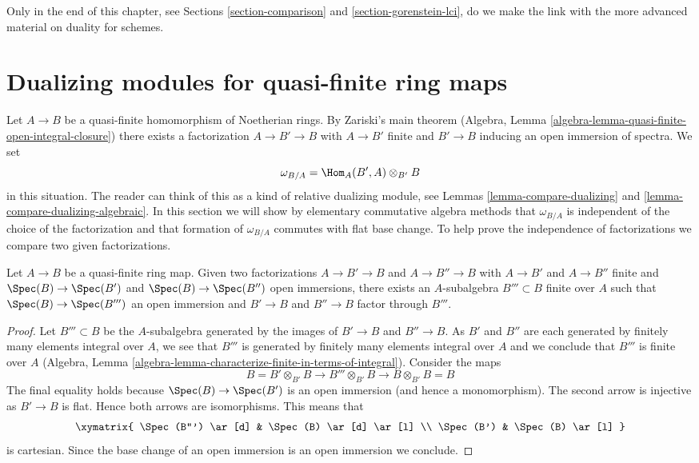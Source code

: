\medskip\noindent
Only in the end of this chapter, see
Sections \ref{section-comparison} and \ref{section-gorenstein-lci},
do we make the link with the more advanced material
on duality for schemes.








\section{Dualizing modules for quasi-finite ring maps}
\label{section-quasi-finite-dualizing}

\noindent
Let $A \to B$ be a quasi-finite homomorphism of Noetherian rings. By
Zariski's main theorem
(Algebra, Lemma \ref{algebra-lemma-quasi-finite-open-integral-closure})
there exists a factorization $A \to B' \to B$ with
$A \to B'$ finite and $B' \to B$ inducing an open immersion of spectra.
We set
\begin{equation}
\label{equation-dualizing}
\omega_{B/A} = \Hom_A(B', A) \otimes_{B'} B
\end{equation}
in this situation. The reader can think of this as a kind of relative
dualizing module, see Lemmas \ref{lemma-compare-dualizing} and
\ref{lemma-compare-dualizing-algebraic}.
In this section we will show by elementary commutative algebra methods
that $\omega_{B/A}$ is independent of the choice of the factorization
and that formation of $\omega_{B/A}$ commutes with flat base change.
To help prove the independence of factorizations we compare two
given factorizations.

\begin{lemma}
\label{lemma-dominate-factorizations}
Let $A \to B$ be a quasi-finite ring map. Given two factorizations
$A \to B' \to B$ and $A \to B'' \to B$ with
$A \to B'$ and $A \to B''$ finite and $\Spec(B) \to \Spec(B')$
and $\Spec(B) \to \Spec(B'')$ open immersions, there exists
an $A$-subalgebra $B''' \subset B$ finite over $A$ such that
$\Spec(B) \to \Spec(B''')$ an open immersion and $B' \to B$ and
$B'' \to B$ factor through $B'''$.
\end{lemma}

\begin{proof}
Let $B''' \subset B$ be the $A$-subalgebra generated by the images
of $B' \to B$ and $B'' \to B$. As $B'$ and $B''$ are each generated
by finitely many elements integral over $A$, we see that $B'''$ is
generated by finitely many elements integral over $A$ and we conclude
that $B'''$ is finite over $A$
(Algebra, Lemma \ref{algebra-lemma-characterize-finite-in-terms-of-integral}).
Consider the maps
$$
B = B' \otimes_{B'} B \to B''' \otimes_{B'} B \to B \otimes_{B'} B = B
$$
The final equality holds because $\Spec(B) \to \Spec(B')$ is an
open immersion (and hence a monomorphism). The second arrow is injective
as $B' \to B$ is flat. Hence both arrows are isomorphisms.
This means that
$$
\xymatrix{
\Spec(B''') \ar[d] & \Spec(B) \ar[d] \ar[l] \\
\Spec(B') & \Spec(B) \ar[l]
}
$$
is cartesian. Since the base change of an open immersion is an
open immersion we conclude.
\end{proof}


